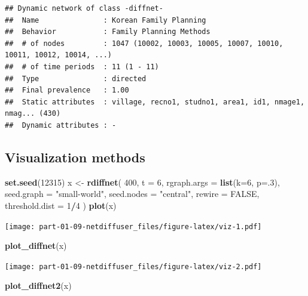 \documentclass[
]{book}
\newenvironment{Shaded}{\begin{snugshade}}{\end{snugshade}}
\newcommand{\AttributeTok}[1]{\textcolor[rgb]{0.13,0.29,0.53}{#1}}
\newcommand{\ConstantTok}[1]{\textcolor[rgb]{0.56,0.35,0.01}{#1}}
\newcommand{\DecValTok}[1]{\textcolor[rgb]{0.00,0.00,0.81}{#1}}
\newcommand{\FunctionTok}[1]{\textcolor[rgb]{0.13,0.29,0.53}{\textbf{#1}}}
\newcommand{\NormalTok}[1]{#1}
\newcommand{\OtherTok}[1]{\textcolor[rgb]{0.56,0.35,0.01}{#1}}
\newcommand{\SpecialCharTok}[1]{\textcolor[rgb]{0.81,0.36,0.00}{\textbf{#1}}}
\newcommand{\StringTok}[1]{\textcolor[rgb]{0.31,0.60,0.02}{#1}}
\begin{document}
\begin{itemize}
\begin{verbatim}
## Dynamic network of class -diffnet-
##  Name               : Korean Family Planning
##  Behavior           : Family Planning Methods
##  # of nodes         : 1047 (10002, 10003, 10005, 10007, 10010, 10011, 10012, 10014, ...)
##  # of time periods  : 11 (1 - 11)
##  Type               : directed
##  Final prevalence   : 1.00
##  Static attributes  : village, recno1, studno1, area1, id1, nmage1, nmag... (430)
##  Dynamic attributes : -
\end{verbatim}
\end{itemize}

\hypertarget{visualization-methods}{%
\subsection{Visualization methods}\label{visualization-methods}}

\begin{Shaded}
\begin{Highlighting}[]
\FunctionTok{set.seed}\NormalTok{(}\DecValTok{12315}\NormalTok{)}
\NormalTok{x }\OtherTok{\textless{}{-}} \FunctionTok{rdiffnet}\NormalTok{(}
  \DecValTok{400}\NormalTok{, }\AttributeTok{t =} \DecValTok{6}\NormalTok{, }\AttributeTok{rgraph.args =} \FunctionTok{list}\NormalTok{(}\AttributeTok{k=}\DecValTok{6}\NormalTok{, }\AttributeTok{p=}\NormalTok{.}\DecValTok{3}\NormalTok{),}
  \AttributeTok{seed.graph =} \StringTok{"small{-}world"}\NormalTok{,}
  \AttributeTok{seed.nodes =} \StringTok{"central"}\NormalTok{, }\AttributeTok{rewire =} \ConstantTok{FALSE}\NormalTok{, }\AttributeTok{threshold.dist =} \DecValTok{1}\SpecialCharTok{/}\DecValTok{4}
\NormalTok{  )}
\FunctionTok{plot}\NormalTok{(x)}
\end{Highlighting}
\end{Shaded}

\texttt{[image: part-01-09-netdiffuser\_files/figure-latex/viz-1.pdf]}

\begin{Shaded}
\begin{Highlighting}[]
\FunctionTok{plot\_diffnet}\NormalTok{(x)}
\end{Highlighting}
\end{Shaded}

\texttt{[image: part-01-09-netdiffuser\_files/figure-latex/viz-2.pdf]}

\begin{Shaded}
\begin{Highlighting}[]
\FunctionTok{plot\_diffnet2}\NormalTok{(x)}
\end{Highlighting}
\end{Shaded}
\end{document}
